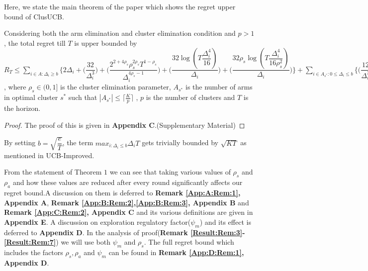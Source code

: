 	
	Here, we state the main theorem of the paper which shows the regret upper bound of ClusUCB.
	
\begin{theorem}
\label{Result:Theorem:1}
Considering both the arm elimination and cluster elimination condition and $p>1$, the total regret till $T$ is upper bounded by $R_{T}\leq \sum_{i\in A:\Delta_{i}\geq b} \bigg\lbrace 2\Delta_{i}+ \bigg(\dfrac{32}{\Delta_{i}^{3}}\bigg) + \bigg(\dfrac{2^{2+4\rho_{s}}\rho_{s}^{2\rho_{s}}T^{1-\rho_{s}}}{\Delta_{i}^{4\rho_{s}-1}}\bigg) + \bigg(\dfrac{32\log{(T\dfrac{\Delta_{i}^{4}}{16})}}{\Delta_{i}}\bigg) + \bigg(\dfrac{32\rho_{s}\log{(T\dfrac{\Delta_{i}^{4}}{16\rho_{s}^{2}})}}{\Delta_{i}}\bigg)\bigg\rbrace + \sum_{i\in A_{s^{*}}:0\leq\Delta_{i}\leq b}\bigg\lbrace \bigg(\dfrac{12}{\Delta_{i}^{3}} \bigg) + \bigg(\dfrac{12}{b^{3}} \bigg)\bigg\rbrace + \sum_{i\in A:0\leq\Delta_{i}\leq b}\bigg\lbrace \bigg(\dfrac{T^{1-\rho_{s}}\rho_{s}^{2\rho_{s}}2^{2\rho_{s}+3}}{\Delta_{i}^{4\rho_{s}-1}} \bigg)+\bigg(\dfrac{T^{1-\rho_{s}}\rho_{s}^{2\rho_{s}}2^{2\rho_{s}+3}}{b^{4\rho_{s} -1}} \bigg) \bigg\rbrace + max_{i:\Delta_{i}\leq b}\Delta_{i}T $, where $\rho_{s}\in (0,1]$ is the cluster elimination parameter, $A_{s^{*}}$ is the number of arms in optimal cluster $s^{*}$ such that $|A_{s^{*}}|\leq \big\lceil\frac{K}{p}\big\rceil$ , $p$ is the number of clusters and $T$ is the horizon.
\end{theorem}

\begin{proof}
	The proof of this is given in \textbf{Appendix C}.(Supplementary Material)
\end{proof}

\begin{remark}
\label{Result:Rem:1}
By setting $b=\sqrt{\dfrac{e}{T}}$, the term $max_{i:\Delta_{i}\leq b}\Delta_{i}T$ gets trivially bounded by $\sqrt{KT}$ as mentioned in UCB-Improved.
\end{remark}

\begin{remark}
\label{Result:Rem:2}
From the statement of Theorem $1$ we can see that taking various values of $\rho_{s}$ and $\rho_{a}$ and how these values are reduced after every round significantly affects our regret bound.A discussion on them is deferred to \textbf{Remark \ref{App:A:Rem:1}, Appendix A}, \textbf{Remark \ref{App:B:Rem:2},\ref{App:B:Rem:3}, Appendix B} and \textbf{Remark \ref{App:C:Rem:2}, Appendix C} and its various definitions are given in \textbf{Appendix E}. A discussion on exploration regulatory factor($\psi_{m}$) and its effect is deferred to \textbf{Appendix D}. In the analysis of proof(\textbf{Remark \ref{Result:Rem:3}-\ref{Result:Rem:7}}) we will use both $\psi_{m}$ and $\rho_{s}$. The full regret bound which includes the factors $\rho_{s},\rho_{a}$ and $\psi_{m}$ can be found in \textbf{Remark \ref{App:D:Rem:1}, Appendix D}.
\end{remark}

